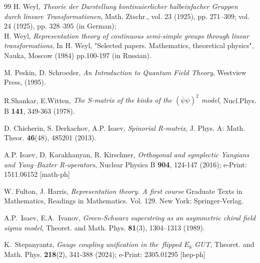 \documentclass[a4paper]{article}
\renewcommand{\=}{\ =\ }
\numberwithin{equation}{section}
\theoremstyle{remark}
\begin{document}
\begin{thebibliography}{99}
  H. Weyl, \textit{Theorie der Darstellung kontinuierlicher halbeinfacher Gruppen durch
lineare Transformationen}, Math. Ztschr., vol. 23 (1925), pp. 271--309; vol. 24 (1925), pp. 328--395 (in German); \\
H. Weyl, \textit{Representation  theory  of
 continuous  semi-simple  groups  through  linear
transformations}, In H. Weyl, "Selected papers. Mathematics,
theoretical physics", Nauka, Moscow (1984) pp.100-197
(in Russian).

 M. Peskin, D. Schroeder, \textit{An Introduction to Quantum Field Theory}, Westview Press, (1995).

 R.Shankar, E.Witten, \textit{The $S$-matrix of the kinks of the $(\overline{\psi}\psi)^2$ model}, Nucl.Phys. B \textbf{141}, 349-363 (1978).

 D. Chicherin, S. Derkachov, A.P. Isaev,
\textit{Spinorial R-matrix}, J. Phys. A: Math. Theor. \textbf{46}(48), 485201 (2013).

 A.P. Isaev, D. Karakhanyan, R. Kirschner, \textit{Orthogonal and symplectic Yangians and Yang–Baxter R-operators}, Nuclear Physics B \textbf{904}, 124-147 (2016);
e-Print: 1511.06152 [math-ph]

 W. Fulton, J. Harris, \textit{Representation theory. A first course}  Graduate Texts in Mathematics, Readings in Mathematics. Vol. 129. New York: Springer-Verlag.

 A.P.~Isaev, E.A.~Ivanov, \textit{Green-Schwarz superstring as an asymmetric chiral field sigma model}, Theoret. and Math. Phys. \textbf{81}(3), 1304–1313 (1989).

 K.~Stepanyantz, \textit{Gauge coupling unification in the~flipped $E_8$ GUT}, Theoret. and Math. Phys. \textbf{218}(2), 341-388 (2024); e-Print: 2305.01295 [hep-ph]

\end{thebibliography}
\end{document}
